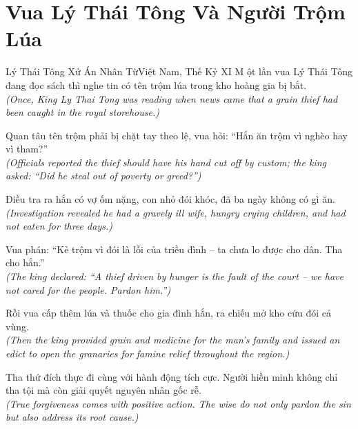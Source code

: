 \section{Vua Lý Thái Tông Và Người Trộm Lúa}
\begin{truyen}{Lý Thái Tông Xử Án Nhân Từ}{Việt Nam, Thế Kỷ XI}
M ột lần vua Lý Thái Tông đang đọc sách thì nghe tin có tên trộm lúa trong kho hoàng gia bị bắt.\\
\textit{(Once, King Ly Thai Tong was reading when news came that a grain thief had been caught in the royal storehouse.)}

Quan tâu tên trộm phải bị chặt tay theo lệ, vua hỏi: ``Hắn ăn trộm vì nghèo hay vì tham?''\\
\textit{(Officials reported the thief should have his hand cut off by custom; the king asked: ``Did he steal out of poverty or greed?'')}

Điều tra ra hắn có vợ ốm nặng, con nhỏ đói khóc, đã ba ngày không có gì ăn.\\
\textit{(Investigation revealed he had a gravely ill wife, hungry crying children, and had not eaten for three days.)}

Vua phán: ``Kẻ trộm vì đói là lỗi của triều đình -- ta chưa lo được cho dân. Tha cho hắn.''\\
\textit{(The king declared: ``A thief driven by hunger is the fault of the court -- we have not cared for the people. Pardon him.'')}

Rồi vua cấp thêm lúa và thuốc cho gia đình hắn, ra chiếu mở kho cứu đói cả vùng.\\
\textit{(Then the king provided grain and medicine for the man's family and issued an edict to open the granaries for famine relief throughout the region.)}

\end{truyen}
\begin{baihoc}
  Tha thứ đích thực đi cùng với hành động tích cực. Người hiền minh không chỉ tha tội mà còn giải quyết nguyên nhân gốc rễ.\\
  \textit{(True forgiveness comes with positive action. The wise do not only pardon the sin but also address its root cause.)}
\end{baihoc}

